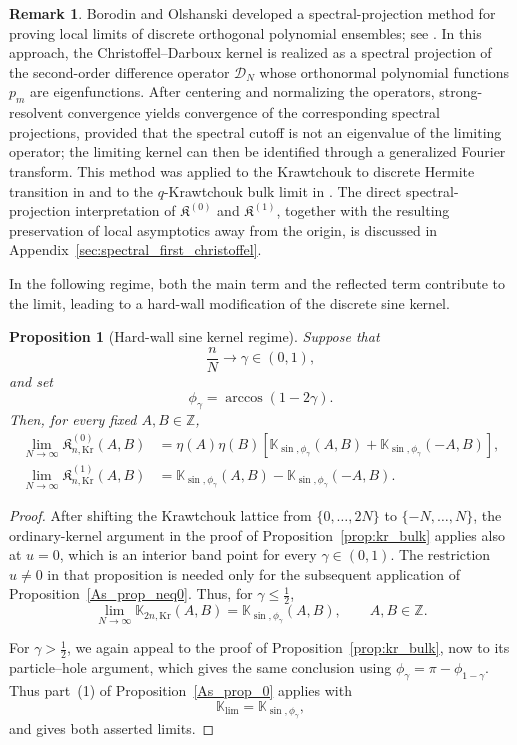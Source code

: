 \documentclass[reqno,11pt]{amsart}
\newcommand{\ZZ}{\mathbb{Z}}
\theoremstyle{plain}
\newtheorem{prop}[thm]{Proposition}
\theoremstyle{definition}
\newtheorem{remark}[thm]{Remark}
\numberwithin{equation}{section}
\begin{document}
\begin{remark}
Borodin and Olshanski developed a spectral-projection method for proving local limits of discrete orthogonal polynomial ensembles; see \cite{borodin2007asymptotics,Borodin_2017}. In this approach, the Christoffel--Darboux kernel is realized as a spectral projection of the second-order difference operator $\mathcal D_N$ whose orthonormal polynomial functions $p_m$ are eigenfunctions. After centering and normalizing the operators, strong-resolvent convergence yields convergence of the corresponding spectral projections, provided that the spectral cutoff is not an eigenvalue of the limiting operator; the limiting kernel can then be identified through a generalized Fourier transform. This method was applied to the Krawtchouk to discrete Hermite transition in \cite[Theorem~6.4]{Borodin_2017}
and to the $q$-Krawtchouk bulk limit in \cite[Theorem~2]{NazNikSar22}. The direct spectral-projection interpretation of $\mathfrak K^{(0)}$ and $\mathfrak K^{(1)}$, together with the resulting preservation of local asymptotics away from the origin, is discussed in Appendix~\ref{sec:spectral_first_christoffel}.
\end{remark}

In the following regime, both the main term and the reflected term contribute to the limit, leading to a hard-wall modification of the discrete sine kernel.
\begin{prop}[Hard-wall sine kernel regime]\label{prop:kr_origin}
Suppose that
\[
\frac{n}{N}\longrightarrow\gamma\in(0,1),
\]
and set
\[
\phi_\gamma=\arccos(1-2\gamma).
\]
Then, for every fixed \(A,B\in\ZZ\),
\begin{align*}
\lim_{N\to\infty}
\mathfrak K_{n,\mathrm{Kr}}^{(0)}(A,B)
&=
\eta(A)\eta(B)
\left[
\mathbb K_{\sin,\phi_\gamma}(A,B)
+
\mathbb K_{\sin,\phi_\gamma}(-A,B)
\right],\\
\lim_{N\to\infty}
\mathfrak K_{n,\mathrm{Kr}}^{(1)}(A,B)
&=
\mathbb K_{\sin,\phi_\gamma}(A,B)
-
\mathbb K_{\sin,\phi_\gamma}(-A,B).
\end{align*}
\end{prop}

\begin{proof}
After shifting the Krawtchouk lattice from $\{0,\ldots,2N\}$ to $\{-N,\ldots,N\}$, 
the ordinary-kernel argument in the proof of Proposition~\ref{prop:kr_bulk} applies also at $u=0$, which is an interior band point for every $\gamma\in(0,1)$. The restriction $u\neq0$ in that proposition is needed only for the subsequent application of Proposition~\ref{As_prop_neq0}. Thus, for $\gamma\leq\frac12$, 
\[
\lim_{N\to\infty}
\mathbb K_{2n,\mathrm{Kr}}(A,B)
=
\mathbb K_{\sin,\phi_\gamma}(A,B),
\qquad
A,B\in\ZZ.
\]

For $\gamma>\frac12$, we again appeal to the proof of Proposition~\ref{prop:kr_bulk}, now to its particle--hole argument, which gives the same conclusion using $\phi_\gamma=\pi-\phi_{1-\gamma}$. Thus part~(1) of
Proposition~\ref{As_prop_0} applies with
\[
\mathbb K_{\lim}=\mathbb K_{\sin,\phi_\gamma},
\]
and gives both asserted limits.
\end{proof}
\end{document}
